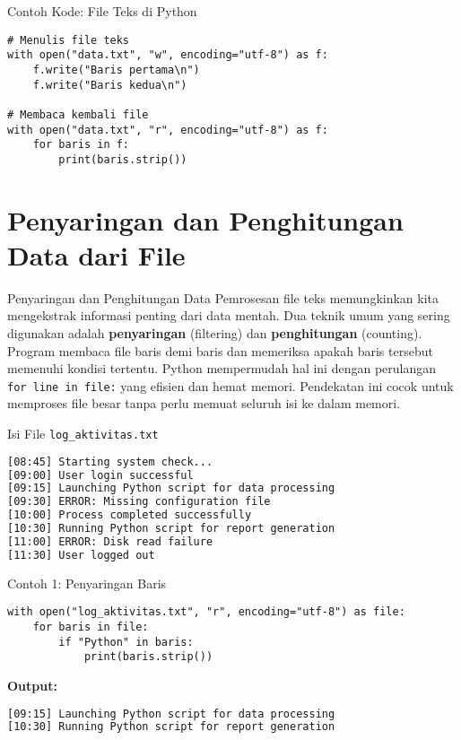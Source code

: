 \documentclass[aspectratio=169, table]{beamer}
\begin{document}
\begin{frame}[fragile]{Contoh Kode: File Teks di Python}
\vspace{20pt}
\begin{lstlisting}[style=PythonStyle]
# Menulis file teks
with open("data.txt", "w", encoding="utf-8") as f:
    f.write("Baris pertama\n")
    f.write("Baris kedua\n")

# Membaca kembali file
with open("data.txt", "r", encoding="utf-8") as f:
    for baris in f:
        print(baris.strip())
\end{lstlisting}
\end{frame}

\section{Penyaringan dan Penghitungan Data dari File}

\begin{frame}{Penyaringan dan Penghitungan Data}
\vspace{20pt}
Pemrosesan file teks memungkinkan kita mengekstrak informasi penting dari data mentah.  
Dua teknik umum yang sering digunakan adalah \textbf{penyaringan} (filtering) dan \textbf{penghitungan} (counting).  
Program membaca file baris demi baris dan memeriksa apakah baris tersebut memenuhi kondisi tertentu.  
Python mempermudah hal ini dengan perulangan \texttt{for line in file:} yang efisien dan hemat memori.  
Pendekatan ini cocok untuk memproses file besar tanpa perlu memuat seluruh isi ke dalam memori.
\end{frame}

\begin{frame}[fragile]{Isi File \texttt{log\_aktivitas.txt}}
\vspace{20pt}
\begin{lstlisting}[language=bash, caption={Cuplikan isi file log_aktivitas.txt}]
[08:45] Starting system check...
[09:00] User login successful
[09:15] Launching Python script for data processing
[09:30] ERROR: Missing configuration file
[10:00] Process completed successfully
[10:30] Running Python script for report generation
[11:00] ERROR: Disk read failure
[11:30] User logged out
\end{lstlisting}
\end{frame}

\begin{frame}[fragile]{Contoh 1: Penyaringan Baris}
\vspace{20pt}
\begin{lstlisting}[style=PythonStyle, caption={Menyaring baris yang mengandung kata "Python"}]
with open("log_aktivitas.txt", "r", encoding="utf-8") as file:
    for baris in file:
        if "Python" in baris:
            print(baris.strip())
\end{lstlisting}

\noindent\textbf{Output:}
\begin{lstlisting}[language=bash, caption={Hasil penyaringan baris yang mengandung "Python"}]
[09:15] Launching Python script for data processing
[10:30] Running Python script for report generation
\end{lstlisting}
\end{frame}
\end{document}
